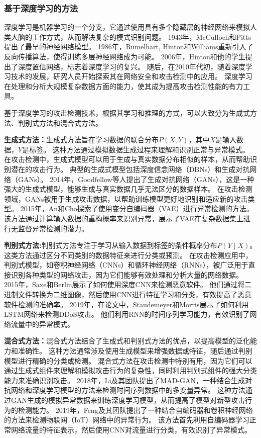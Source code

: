 \subsubsection*{基于深度学习的方法}
深度学习是机器学习的一个分支，它通过使用具有多个隐藏层的神经网络来模拟人类大脑的工作方式，从而解决复杂的模式识别问题。
1943年，McCulloch和Pitts提出了最早的神经网络模型。
1986年，Rumelhart, Hinton和Williams重新引入了反向传播算法，使得训练多层神经网络成为可能。
2006年，Hinton和他的学生提出了深度置信网络，标志着深度学习的复兴。
随后，在2010年代初，随着深度学习技术的发展，研究人员开始探索其在网络安全和攻击检测中的应用。
深度学习在处理和分析大规模复杂数据方面的能力，使其成为提高攻击检测性能的有力工具。

基于深度学习的攻击检测技术，根据其学习和推理的方式，可以大致分为生成式方法、判别式方法和混合式方法。


\textbf{生成式方法：}生成式方法旨在学习数据的联合分布$P(X,Y)$，其中$X$是输入数据，$Y$是标签。
这种方法通过模拟数据生成过程来理解和识别正常与异常模式。
在攻击检测中，生成式模型可以用于生成与真实数据分布相似的样本，从而帮助识别潜在的攻击行为。
典型的生成式模型包括深度信念网络（DBNs）和生成对抗网络（GANs）。
2014年，Goodfellow等人提出了生成对抗网络（GANs）\cite{goodfellow2014generative}，这是一种强大的生成式模型，能够生成与真实数据几乎无法区分的数据样本。
在攻击检测领域，GANs被用于生成攻击数据，以帮助训练模型更好地识别和适应新的攻击类型。
2015年，An和Cho探索了使用变分自编码器（VAE）进行异常检测的方法\cite{an2015variational}。
该方法通过计算输入数据的重构概率来识别异常，展示了VAE在复杂数据集上进行无监督异常检测的潜力。


\textbf{判别式方法:}判别式方法专注于学习从输入数据到标签的条件概率分布$P(Y∣X)$。
这类方法通过区分不同类别的数据特征来进行分类或预测。
在攻击检测应用中，判别式模型，如卷积神经网络（CNNs）和循环神经网络（RNNs），被广泛用于直接识别各种类型的网络攻击，因为它们能够有效处理和分析大量的网络数据。
2015年，Saxe和Berlin展示了如何使用深度CNN来检测恶意软件\cite{saxe2015deep}。
他们通过将二进制文件转换为二维图像，然后使用CNN进行特征学习和分类，有效提高了恶意软件检测的准确率。
2019年，在论文中，Staudemeyer和Morris展示了如何利用LSTM网络来检测DDoS攻击。
他们利用RNN的时间序列学习能力，有效识别了网络流量中的异常模式。

\textbf{混合式方法：}混合式方法结合了生成式和判别式方法的优点，以提高模型的泛化能力和准确性。
这种方法通常涉及使用生成模型来增强数据或特征，随后通过判别模型进行精确的分类或检测。
混合式方法在攻击检测中特别有用，因为它们可以通过生成式组件来理解和模拟攻击行为的复杂性，同时利用判别式组件的强大分类能力来准确识别攻击。
2018年，Li及其团队提出了MAD-GAN\cite{li2018mad}，一种结合生成对抗网络和深度学习模型的方法来检测时间序列数据中的多变量异常。
这种方法通过GAN生成的模拟异常数据来训练深度学习模型，从而提高了模型对新型攻击行为的检测能力。
2019年，Feng及其团队提出了一种结合自编码器和卷积神经网络的方法来检测物联网（IoT）网络中的异常行为\cite{feng2019deep}。
该方法首先利用自编码器学习正常网络流量的特征表示，然后使用CNN对流量进行分类，有效识别了异常模式。


